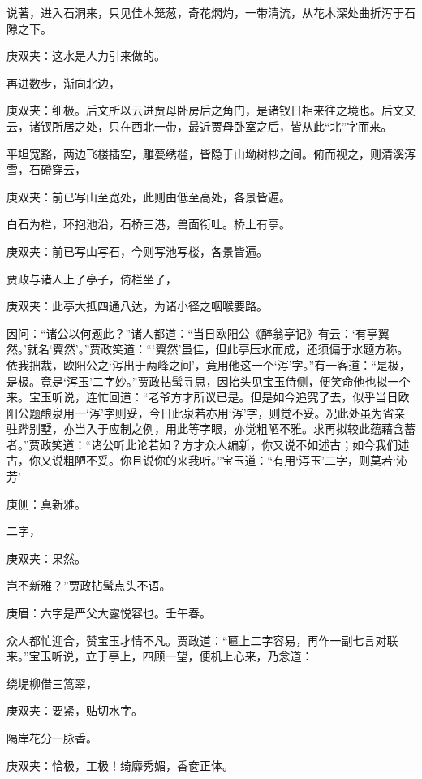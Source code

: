 \begin{parag}
    说著，进入石洞来，只见佳木笼葱，奇花熌灼，一带清流，从花木深处曲折泻于石隙之下。 \begin{note}庚双夹：这水是人力引来做的。\end{note} 再进数步，渐向北边， \begin{note}庚双夹：细极。后文所以云进贾母卧房后之角门，是诸钗日相来往之境也。后文又云，诸钗所居之处，只在西北一带，最近贾母卧室之后，皆从此“北”字而来。\end{note} 平坦宽豁，两边飞楼插空，雕甍绣槛，皆隐于山坳树杪之间。俯而视之，则清溪泻雪，石磴穿云， \begin{note}庚双夹：前已写山至宽处，此则由低至高处，各景皆遍。\end{note} 白石为栏，环抱池沿，石桥三港，兽面衔吐。桥上有亭。 \begin{note}庚双夹：前已写山写石，今则写池写楼，各景皆遍。\end{note} 贾政与诸人上了亭子，倚栏坐了， \begin{note}庚双夹：此亭大抵四通八达，为诸小径之咽喉要路。\end{note} 因问：“诸公以何题此？”诸人都道：“当日欧阳公《醉翁亭记》有云：‘有亭翼然。’就名‘翼然’。”贾政笑道：“‘翼然’虽佳，但此亭压水而成，还须偏于水题方称。依我拙裁，欧阳公之‘泻出于两峰之间’，竟用他这一个‘泻’字。”有一客道：“是极，是极。竟是‘泻玉’二字妙。”贾政拈髯寻思，因抬头见宝玉侍侧，便笑命他也拟一个来。宝玉听说，连忙回道：“老爷方才所议已是。但是如今追究了去，似乎当日欧阳公题酿泉用一‘泻’字则妥，今日此泉若亦用‘泻’字，则觉不妥。况此处虽为省亲驻跸别墅，亦当入于应制之例，用此等字眼，亦觉粗陋不雅。求再拟较此蕴藉含蓄者。”贾政笑道：“诸公听此论若如？方才众人编新，你又说不如述古；如今我们述古，你又说粗陋不妥。你且说你的来我听。”宝玉道：“有用‘泻玉’二字，则莫若‘沁芳’ \begin{note}庚侧：真新雅。\end{note} 二字， \begin{note}庚双夹：果然。\end{note} 岂不新雅？”贾政拈髯点头不语。 \begin{note}庚眉：六字是严父大露悦容也。壬午春。\end{note} 众人都忙迎合，赞宝玉才情不凡。贾政道：“匾上二字容易，再作一副七言对联来。”宝玉听说，立于亭上，四顾一望，便机上心来，乃念道：
\end{parag}


\begin{poem}
    \begin{pl}绕堤柳借三篙翠，\end{pl}
    \begin{note}庚双夹：要紧，贴切水字。\end{note}

    \begin{pl}隔岸花分一脉香。\end{pl}
    \begin{note}庚双夹：恰极，工极！绮靡秀媚，香奁正体。\end{note}
\end{poem}


